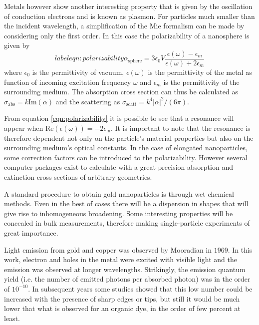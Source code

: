 Metals however show another interesting property that is given by the
oscillation of conduction electrons and is known as plasmon. For particles much
smaller than the incident wavelength, a simplification of the Mie formalism can
be made by considering only the first order. In this case the polarizability of
a nanosphere is given by
\begin{equation}label{eqn:polarizability}
	\alpha_{\textrm{sphere}} =
	3\epsilon_0V\frac{\epsilon(\omega)-\epsilon_m}{\epsilon(\omega)+2\epsilon_m}
\end{equation}
where $\epsilon_0$ is the permittivity of vacuum, $\epsilon(\omega)$ is the
permittivity of the metal as function of incoming excitation frequency $\omega$
and $\epsilon_m$ is the permittivity of the surrounding medium. The absorption
cross section can thus be calculated as
$\sigma_\textrm{abs}=k\textrm{Im}(\alpha)$ and the scattering as
$\sigma_\textrm{scatt}=k^4|\alpha|^2/(6\pi)$.

From equation \ref{eqn:polarizability} it is possible to see that a resonance
will appear when $\textrm{Re}(\epsilon(\omega)) = -2\epsilon_\textrm{m}$. It is
important to note that the resonance is therefore dependent not only on the
particle's material properties but also on the surrounding medium's optical
constants. In the case of elongated nanoparticles, some correction factors can
be introduced to the polarizability. However several computer packages exist to
calculate with a great precision absorption and extinction cross sections of
arbitrary geometries. 

A standard procedure to obtain gold nanoparticles is through wet chemical
methods. Even in the best of cases there will be a dispersion in shapes that
will give rise to inhomogeneous broadening. Some interesting properties will be
concealed in bulk measurements, therefore making single-particle experiments of
great importance. 

Light emission from gold and copper was observed by
Mooradian\cite{Mooradian1969} in $1969$. In this work, electron and holes in the
metal were excited with visible light and the emission was observed at longer
wavelengths. Strikingly, the emission quantum yield (i.e. the number of
emitted photons per absorbed photon) was in the order of $10^{-10}$. In
subsequent years some studies showed that this low number could be increased
with the presence of sharp edges or tips, but still it would be much lower that
what is observed for an organic dye, in the order of few percent at least. 



